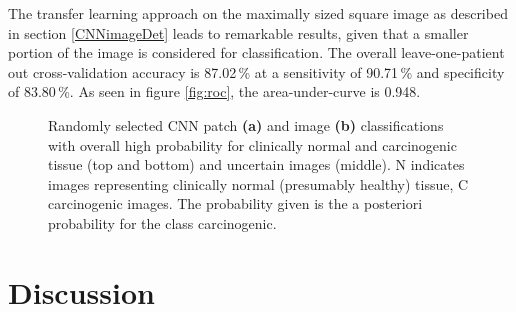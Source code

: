 \documentclass[fleqn,10pt]{wlscirep}
\begin{document}
The transfer learning approach on the maximally sized square image as described in section 
\ref{CNNimageDet} leads to remarkable results, given that a smaller portion of the image is considered for classification. The overall leave-one-patient out cross-validation accuracy is 87.02\,\% at a sensitivity of 90.71\,\% and specificity of 83.80\,\%. As seen in figure \ref{fig:roc}, the area-under-curve is 0.948. 

\vspace{1em}



\vspace{1em}

\begin{figure}[!t]
\centering
{}
\caption{
Randomly selected CNN patch \textbf{(a)} and image \textbf{(b)} classifications with overall high probability for clinically normal and carcinogenic tissue (top and bottom) and
uncertain images (middle). N indicates images representing clinically normal (presumably healthy) tissue, C carcinogenic
  images. The probability given is the a posteriori probability for
  the class carcinogenic.
}


\end{figure}







\section{Discussion}
\end{document}
